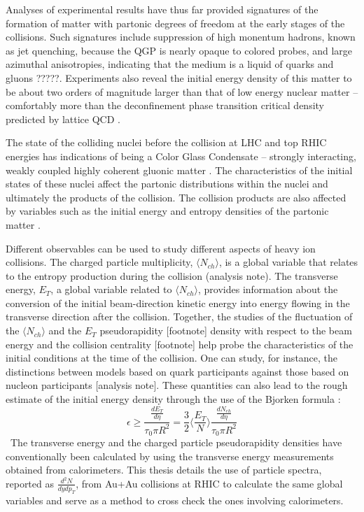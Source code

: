 Analyses of experimental results have thus far provided signatures of the formation of matter with partonic degrees of freedom at the early stages of the collisions. Such signatures include suppression of high monentum hadrons, known as jet quenching, because the QGP is nearly opaque to colored probes, and large azimuthal anisotropies, indicating that the medium is a liquid of quarks and gluons \cite{PhysRevC.96.044904}?????. Experiments also reveal the initial energy density of this matter to be about two orders of magnitude larger than that of low energy nuclear matter -- comfortably more than the deconfinement phase transition critical density predicted by lattice QCD \cite{2005PrPNP..54..443J}.

The state of the colliding nuclei before the collision at LHC and top RHIC energies has indications of being a Color Glass Condensate -- strongly interacting, weakly coupled highly coherent gluonic matter \cite{1742-6596-458-1-012024}. The characteristics of the initial states of these nuclei affect the partonic distributions within the nuclei and ultimately the products of the collision. The collision products are also affected by variables such as the initial energy and entropy densities of the partonic matter \cite{2005PrPNP..54..443J}.

Different observables can be used to study different aspects of heavy ion collisions. The charged particle multiplicity, $\langle N_{ch} \rangle$, is a global variable that relates to the entropy production during the collision (analysis note). The transverse energy, $E_{T}$, a global variable related to $\langle N_{ch} \rangle$, provides information about the conversion of the initial beam-direction kinetic energy into energy flowing in the transverse direction after the collision. Together, the studies of the fluctuation of the $\langle N_{ch} \rangle$ and the $E_{T}$ pseudorapidity [footnote] density with respect to the beam energy and the collision centrality [footnote] help probe the characteristics of the initial conditions at the time of the collision. One can study, for instance, the distinctions between models based on quark participants against those based on nucleon participants [analysis note]. These quantities can also lead to the rough estimate of the initial energy density through the use of the Bjorken formula \cite{2012ARNPS..62..361M}:
\begin{equation}\label{eqn:Bjorken}
\epsilon \geq \frac{\frac{dE_{T}}{d\eta}}{\tau_{0}\pi R^{2}} = \frac{3}{2}\langle \frac{E_{T}}{N} \rangle \frac{\frac{dN_{ch}}{d\eta}}{\tau_{0}\pi R^{2}}
\end{equation}
\
The transverse energy and the charged particle pseudorapidity densities have conventionally been calculated by using the transverse energy measurements obtained from calorimeters. This thesis details the use of particle spectra, reported as $\frac{d^{2}N}{dydp_{T}}$, from Au+Au collisions at RHIC to calculate the same global variables and serve as a method to cross check the ones involving calorimeters.

